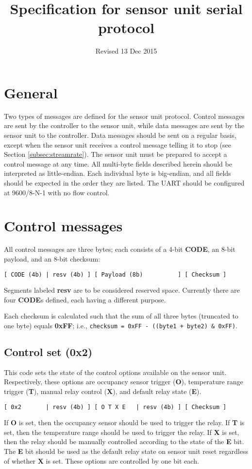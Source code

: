 \documentclass[11pt]{article}
\title{\textbf{Specification for sensor unit serial protocol}}
\date{\vspace{-24pt} Revised 13 Dec 2015}
\begin{document}
\maketitle

\parskip   0pt

\section{General}
Two types of messages are defined for the sensor unit protocol. Control messages are sent by the controller to the sensor unit, while data messages are sent by the sensor unit to the controller. Data messages should be sent on a regular basis, except when the sensor unit receives a control message telling it to stop (see Section \ref{subsec:streamrate}). The sensor unit must be prepared to accept a control message at any time. All multi-byte fields described herein should be interpreted as little-endian. Each individual byte is big-endian, and all fields should be expected in the order they are listed. The UART should be configured at 9600/8-N-1 with no flow control.

\section{Control messages}
All control messages are three bytes; each consists of a 4-bit \textbf{CODE}, an 8-bit payload, and an 8-bit checksum:
\begin{verbatim}
[ CODE (4b) | resv (4b) ] [ Payload (8b)          ] [ Checksum ]
\end{verbatim}
Segments labeled \textbf{resv} are to be considered reserved space. Currently there are four \textbf{CODE}s defined, each having a different purpose.

Each checksum is calculated such that the sum of all three bytes (truncated to one byte) equals \textbf{0xFF}; i.e., \texttt{checksum = 0xFF - ((byte1 + byte2) \& 0xFF)}.

\subsection{Control set (0x2)}
This code sets the state of the control options available on the sensor unit. Respectively, these options are occupancy sensor trigger (\textbf{O}), temperature range trigger (\textbf{T}), manual relay control (\textbf{X}), and default relay state (\textbf{E}).
\begin{verbatim}
[ 0x2       | resv (4b) ] [ O T X E   | resv (4b) ] [ Checksum ]
\end{verbatim}
If \textbf{O} is set, then the occupancy sensor should be used to trigger the relay. If \textbf{T} is set, then the temperature range should be used to trigger the relay. If \textbf{X} is set, then the relay should be manually controlled according to the state of the \textbf{E} bit. The \textbf{E} bit should be used as the default relay state on sensor unit reset regardless of whether \textbf{X} is set. These options are controlled by one bit each.
\end{document}
